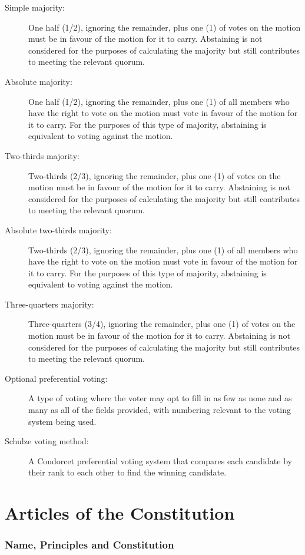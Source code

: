 \documentclass[a4paper,titlepage,8.5pt]{article}
\begin{document}
\begin{description}
\item[Simple majority:] One half (1/2), ignoring the remainder, plus one (1) of votes on the motion must be in favour of the motion for it to carry. Abstaining is not considered for the purposes of calculating the majority but still contributes to meeting the relevant quorum.
\item[Absolute majority:] One half (1/2), ignoring the remainder, plus one (1) of all members who have the right to vote on the motion must vote in favour of the motion for it to carry. For the purposes of this type of majority, abstaining is equivalent to voting against the motion.
\item[Two-thirds majority:] Two-thirds (2/3), ignoring the remainder, plus one (1) of votes on the motion must be in favour of the motion for it to carry. Abstaining is not considered for the purposes of calculating the majority but still contributes to meeting the relevant quorum.
\item[Absolute two-thirds majority:] Two-thirds (2/3), ignoring the remainder, plus one (1) of all members who have the right to vote on the motion must vote in favour of the motion for it to carry. For the purposes of this type of majority, abstaining is equivalent to voting against the motion.
\item[Three-quarters majority:] Three-quarters (3/4), ignoring the remainder, plus one (1) of votes on the motion must be in favour of the motion for it to carry. Abstaining is not considered for the purposes of calculating the majority but still contributes to meeting the relevant quorum.
\item[Optional preferential voting:] A type of voting where the voter may opt to fill in as few as none and as many as all of the fields provided, with numbering relevant to the voting system being used.
\item[Schulze voting method:] A Condorcet preferential voting system that compares each candidate by their rank to each other to find the winning candidate.
\end{description}
\newpage

\part{Articles of the Constitution}

\section{Name, Principles and Constitution}
\end{document}
